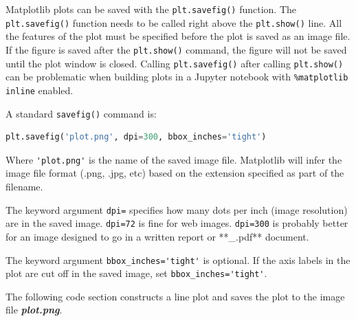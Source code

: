 \documentclass{book}
\begin{document}
    
        Matplotlib plots can be saved with the \lstinline!plt.savefig()!
function. The \lstinline!plt.savefig()! function needs to be called
right above the \lstinline!plt.show()! line. All the features of the
plot must be specified before the plot is saved as an image file. If the
figure is saved after the \lstinline!plt.show()! command, the figure
will not be saved until the plot window is closed. Calling
\lstinline!plt.savefig()! after calling \lstinline!plt.show()! can be
problematic when building plots in a Jupyter notebook with
\lstinline!%matplotlib inline! enabled.

A standard \lstinline!savefig()! command is:

\begin{lstlisting}[language=Python]
plt.savefig('plot.png', dpi=300, bbox_inches='tight')
\end{lstlisting}

Where \lstinline!'plot.png'! is the name of the saved image file.
Matplotlib will infer the image file format (.png, .jpg, etc) based on
the extension specified as part of the filename.

The keyword argument \lstinline!dpi=! specifies how many dots per inch
(image resolution) are in the saved image. \lstinline!dpi=72! is fine
for web images. \lstinline!dpi=300! is probably better for an image
designed to go in a written report or **\_.pdf** document.

The keyword argument \lstinline!bbox_inches='tight'! is optional. If the
axis labels in the plot are cut off in the saved image, set
\lstinline!bbox_inches='tight'!.

The following code section constructs a line plot and saves the plot to
the image file \textbf{\emph{plot.png}}.
    
\end{document}
